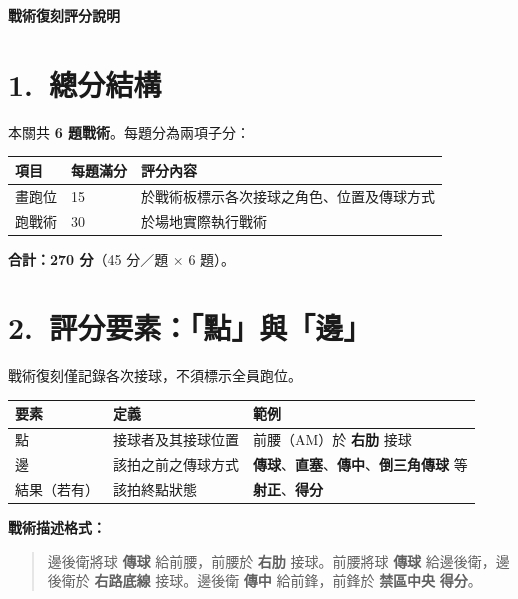 \documentclass[11pt]{article}
\newcommand{\term}[1]{\textbf{#1}}
\begin{document}
{\LARGE\bfseries 戰術復刻評分說明\par}
\vspace{0.8em}

\section*{1.\ 總分結構}

本關共 \term{6 題戰術}。每題分為兩項子分：

\vspace{0.4em}
\begin{tabular}{@{}lll@{}}
\toprule
\textbf{項目} & \textbf{每題滿分} & \textbf{評分內容} \\
\midrule
畫跑位 & 15 & 於戰術板標示各次接球之角色、位置及傳球方式 \\
跑戰術 & 30 & 於場地實際執行戰術 \\
\bottomrule
\end{tabular}

\vspace{0.4em}
\noindent
\textbf{合計：270 分}（45 分／題 $\times$ 6 題）。

\section*{2.\ 評分要素：「點」與「邊」}

戰術復刻僅記錄各次接球，不須標示全員跑位。

\vspace{0.4em}
\begin{tabular}{@{}p{2.2cm}p{4.2cm}p{6.8cm}@{}}
\toprule
\textbf{要素} & \textbf{定義} & \textbf{範例} \\
\midrule
點 & 接球者及其接球位置 & 前腰（AM）於 \term{右肋} 接球 \\
邊 & 該拍之前之傳球方式 & \term{傳球}、\term{直塞}、\term{傳中}、\term{倒三角傳球} 等 \\
結果（若有） & 該拍終點狀態 & \term{射正}、\term{得分} \\
\bottomrule
\end{tabular}

\vspace{0.6em}
\noindent\textbf{戰術描述格式：}

\begin{quote}
邊後衛將球 \term{傳球} 給前腰，前腰於 \term{右肋} 接球。前腰將球 \term{傳球} 給邊後衛，邊後衛於 \term{右路底線} 接球。邊後衛 \term{傳中} 給前鋒，前鋒於 \term{禁區中央} \term{得分}。
\end{quote}
\end{document}
